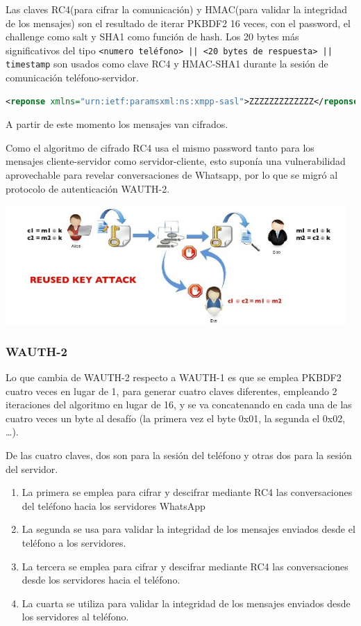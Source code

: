 \documentclass[a4paper, 11pt]{article} %
\begin{document}
Las claves RC4(para cifrar la comunicación) y HMAC(para validar la integridad de los mensajes) son el resultado 
de iterar PKBDF2 16 veces, con el password, el challenge como salt y SHA1 como función de hash. Los 20 bytes más
significativos del tipo \texttt{<numero teléfono> || <20 bytes de respuesta> || timestamp} son usados como clave
RC4 y HMAC-SHA1 durante la sesión de comunicación teléfono-servidor.

\begin{lstlisting}[language=XML]
 <reponse xmlns="urn:ietf:paramsxml:ns:xmpp-sasl">ZZZZZZZZZZZZZ</reponse>
\end{lstlisting}

A partir de este momento los mensajes van cifrados.

Como el algoritmo de cifrado RC4 usa el mismo password tanto para los mensajes cliente-servidor como servidor-cliente,
esto suponía una vulnerabilidad aprovechable para revelar conversaciones de Whatsapp, por lo que se migró al protocolo
de autenticación WAUTH-2.
    \begin{center}
      \includegraphics[width=13cm]{wauth-1.jpg}
    \end{center}
\subsubsection{WAUTH-2}
Lo que cambia de WAUTH-2 respecto a WAUTH-1 es que se emplea PKBDF2 cuatro veces en lugar de 1, para generar cuatro
claves diferentes, empleando 2 iteraciones del algoritmo en lugar de 16, y se va concatenando en cada una de las
cuatro veces un byte al desafío (la primera vez el byte 0x01, la segunda el 0x02, \ldots).

De las cuatro claves, dos son para la sesión del teléfono y otras dos para la sesión del servidor.
\begin{enumerate}
 \item La primera se emplea para cifrar y descifrar mediante RC4 las conversaciones del teléfono hacia los servidores
  WhatsApp
 \item La segunda se usa para validar la integridad de los mensajes enviados desde el teléfono a los servidores.
 \item La tercera se emplea para cifrar y descifrar mediante RC4 las conversaciones desde los servidores hacia el 
  teléfono.
 \item La cuarta se utiliza para validar la integridad de los mensajes enviados desde los servidores al teléfono.
\end{enumerate}
\end{document}
